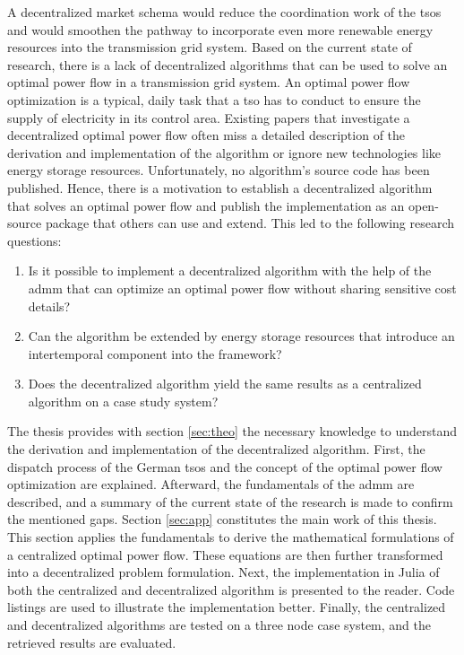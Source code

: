 A decentralized market schema would reduce the coordination work of the \glspl{tso} and would smoothen the pathway to incorporate even more renewable energy resources into the transmission grid system. Based on the current state of research, there is a lack of decentralized algorithms that can be used to solve an optimal power flow in a transmission grid system. An optimal power flow optimization is a typical, daily task that a \gls{tso} has to conduct to ensure the supply of electricity in its control area. Existing papers that investigate a decentralized optimal power flow often miss a detailed description of the derivation and implementation of the algorithm or ignore new technologies like energy storage resources. Unfortunately, no algorithm's source code has been published. Hence, there is a motivation to establish a decentralized algorithm that solves an optimal power flow and publish the implementation as an open-source package that others can use and extend. This led to the following research questions:

\begin{enumerate}
	\item Is it possible to implement a decentralized algorithm with the help of the \gls{admm} that can optimize an optimal power flow without sharing sensitive cost details?
	\item Can the algorithm be extended by energy storage resources that introduce an intertemporal component into the framework?
	\item Does the decentralized algorithm yield the same results as a centralized algorithm on a case study system?
\end{enumerate}

The thesis provides with section \ref{sec:theo} the necessary knowledge to understand the derivation and implementation of the decentralized algorithm. First, the dispatch process of the German \glspl{tso} and the concept of the optimal power flow optimization are explained. Afterward, the fundamentals of the \gls{admm} are described, and a summary of the current state of the research is made to confirm the mentioned gaps. Section \ref{sec:app} constitutes the main work of this thesis. This section applies the fundamentals to derive the mathematical formulations of a centralized optimal power flow. These equations are then further transformed into a decentralized problem formulation. Next, the implementation in Julia of both the centralized and decentralized algorithm is presented to the reader. Code listings are used to illustrate the implementation better. Finally, the centralized and decentralized algorithms are tested on a three node case system, and the retrieved results are evaluated.



